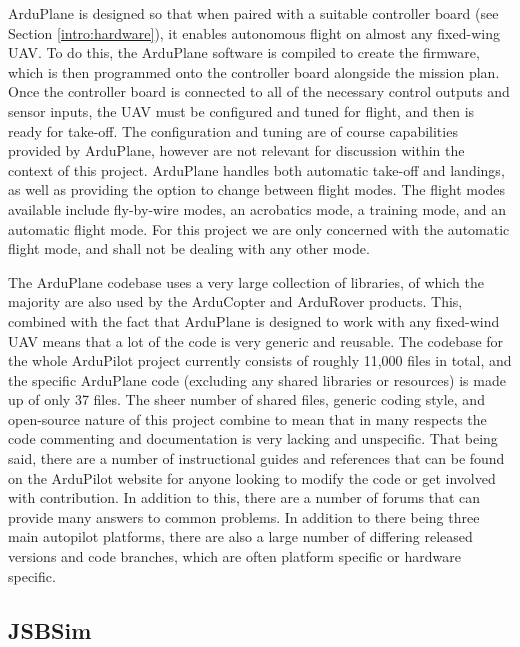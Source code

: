 ArduPlane is designed so that when paired with a suitable controller board (see Section \ref{intro:hardware}), it enables autonomous flight on almost any fixed-wing UAV. %
To do this, the ArduPlane software is compiled to create the firmware, which is then programmed onto the controller board alongside the mission plan. Once the controller board is connected to all of the necessary control outputs and sensor inputs, the UAV must be configured and tuned for flight, and then is ready for take-off. The configuration and tuning are of course capabilities provided by ArduPlane, however are not relevant for discussion within the context of this project. ArduPlane handles both automatic take-off and landings, as well as providing the option to change between flight modes. The flight modes available include fly-by-wire modes, an acrobatics mode, a training mode, and an automatic flight mode. For this project we are only concerned with the automatic flight mode, and shall not be dealing with any other mode. 

The ArduPlane codebase uses a very large collection of libraries, of which the majority are also used by the ArduCopter and ArduRover products. This, combined with the fact that ArduPlane is designed to work with any fixed-wind UAV means that a lot of the code is very generic and reusable. The codebase for the whole ArduPilot project currently consists of roughly 11,000 files in total, and the specific ArduPlane code (excluding any shared libraries or resources) is made up of only 37 files. The sheer number of shared files, generic coding style, and open-source nature of this project combine to mean that in many respects the code commenting and documentation is very lacking and unspecific. That being said, there are a number of instructional guides and references that can be found on the ArduPilot website for anyone looking to modify the code or get involved with contribution. In addition to this, there are a number of forums that can provide many answers to common problems. %
In addition to there being three main autopilot platforms, there are also a large number of differing released versions and code branches, which are often platform specific or hardware specific.



\subsection{JSBSim}
\label{intro:jsbsim}

